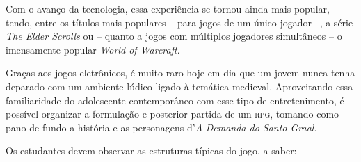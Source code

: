 \documentclass[11pt]{extarticle}
\begin{document}
Com o avanço da tecnologia, essa experiência se tornou ainda mais
popular, tendo, entre os títulos mais populares -- para jogos de um
único jogador --, a série \emph{The Elder Scrolls} ou -- quanto a jogos
com múltiplos jogadores simultâneos -- o imensamente popular \emph{World
of Warcraft}.

Graças aos jogos eletrônicos, é muito raro hoje em dia que um jovem
nunca tenha deparado com um ambiente lúdico ligado à temática medieval.
Aproveitando essa familiaridade do adolescente contemporâneo com esse
tipo de entretenimento, é possível organizar a formulação e posterior
partida de um \textsc{rpg}, tomando como pano de fundo a história e as
personagens d'\emph{A} \emph{Demanda do Santo Graal}.

Os estudantes devem observar as estruturas típicas do jogo, a saber:
\end{document}
